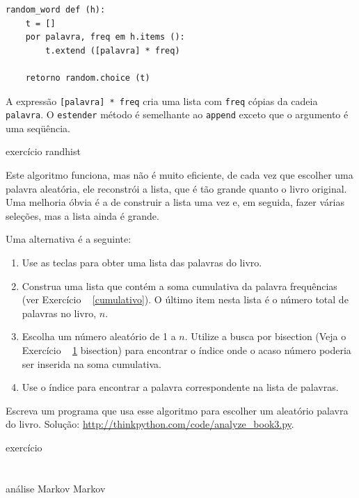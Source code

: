 \documentclass[10pt]{book}
\begin{document}
\begin{v erbatim}
\begin{verbatim}
random_word def (h):
    t = []
    por palavra, freq em h.items ():
        t.extend ([palavra] * freq)

    retorno random.choice (t)
\end{verbatim}
%
A expressão {\tt [palavra] * freq} cria uma lista com {\tt freq}
cópias da cadeia {\tt palavra}. O {\tt estender}
método é semelhante ao {\tt append} exceto que o argumento é
uma seqüência.

\begin{} exercício
\label{} randhist

Este algoritmo funciona, mas não é muito eficiente, de cada vez que
escolher uma palavra aleatória, ele reconstrói a lista, que é tão grande quanto
o livro original. Uma melhoria óbvia é a de construir a lista
uma vez e, em seguida, fazer várias seleções, mas a lista ainda é grande.

Uma alternativa é a seguinte:

\begin{enumerate}

\item Use as teclas {\tt} para obter uma lista das palavras do livro.

\item Construa uma lista que contém a soma cumulativa da palavra
  frequências (ver Exercício ~ \ref {cumulativo}). O último item
  nesta lista é o número total de palavras no livro, $ n $.
  
\item Escolha um número aleatório de 1 a $ n $. Utilize a busca por bisection
  (Veja o Exercício ~ \ref {} bisection) para encontrar o índice onde o acaso
  número poderia ser inserida na soma cumulativa.

\item Use o índice para encontrar a palavra correspondente na lista de palavras.

\end{enumerate}

Escreva um programa que usa esse algoritmo para escolher um aleatório
palavra do livro. Solução: \url{http://thinkpython.com/code/analyze_book3.py}.

\end{} exercício



\section{} análise Markov
\label{} Markov


\end{v erbatim}
\end{document}
